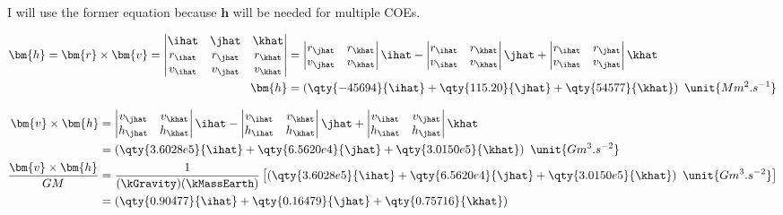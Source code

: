 \documentclass{article}
\begin{document}
{	I will use the former equation because $\bm{h}$ will be needed for multiple COEs.
	
	\begin{equation*}
		\begin{split}
			\bm{h} = \bm{r} \times \bm{v} =
			\begin{vmatrix}
				\ihat & \jhat & \khat \\
				r_{\ihat} & r_{\jhat} & r_{\khat} \\
				v_{\ihat} & v_{\jhat} & v_{\khat}
			\end{vmatrix}
			&= \begin{vmatrix}
				r_{\jhat} & r_{\khat} \\
				v_{\jhat} & v_{\khat}
			\end{vmatrix} \ihat
			- \begin{vmatrix}
				r_{\ihat} & r_{\khat} \\
				v_{\ihat} & v_{\khat}
			\end{vmatrix} \jhat
			+ \begin{vmatrix}
				r_{\ihat} & r_{\jhat} \\
				v_{\ihat} & v_{\jhat}
			\end{vmatrix} \khat \\
			\bm{h} &= \left( \qty{-45694}{\ihat} + \qty{115.20}{\jhat} + \qty{54577}{\khat} \right) \ \unit{Mm^2.s^{-1}}
		\end{split}
	\end{equation*}
	
	\begin{equation*}
		\begin{split}
			\bm{v} \times \bm{h} &= \begin{vmatrix}
				v_{\jhat} & v_{\khat} \\
				h_{\jhat} & h_{\khat}
			\end{vmatrix} \ihat
			- \begin{vmatrix}
				v_{\ihat} & v_{\khat} \\
				h_{\ihat} & h_{\khat}
			\end{vmatrix} \jhat
			+ \begin{vmatrix}
				v_{\ihat} & v_{\jhat} \\
				h_{\ihat} & h_{\jhat}
			\end{vmatrix} \khat \\
			 &= \left( \qty{3.6028e5}{\ihat} + \qty{6.5620e4}{\jhat} + \qty{3.0150e5}{\khat} \right) \ \unit{Gm^3.s^{-2}} \\
			 \frac{\bm{v} \times \bm{h}}{GM} &= \frac{1}{(\kGravity)(\kMassEarth)} \left[ \left( \qty{3.6028e5}{\ihat} + \qty{6.5620e4}{\jhat} + \qty{3.0150e5}{\khat} \right) \ \unit{Gm^3.s^{-2}} \right] \\
			 &= \left( \qty{0.90477}{\ihat} + \qty{0.16479}{\jhat} + \qty{0.75716}{\khat} \right)
		\end{split}
	\end{equation*}
	
}
\end{document}
